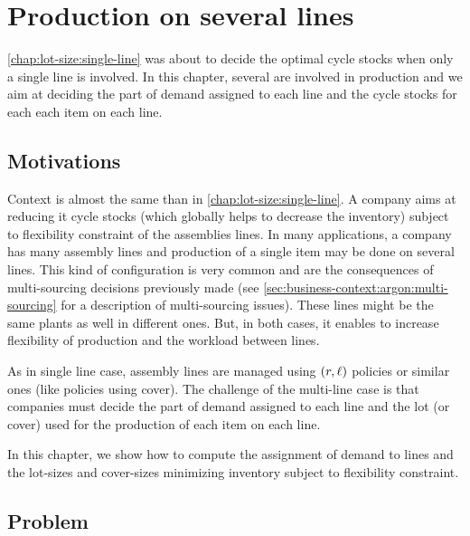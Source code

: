 \chapter{Production on several lines}
\label{chap:lot-size:several-lines}



\cref{chap:lot-size:single-line} was about to decide the optimal cycle stocks when only a single line is involved.
In this chapter, several are involved in production and we aim at deciding the part of demand assigned to each line and the cycle stocks for each each item on each line.



\section{Motivations}
\label{sec:lot-size:several-lines:motivations}


Context is almost the same than in \cref{chap:lot-size:single-line}.
A company aims at reducing it cycle stocks (which globally helps to decrease the inventory) subject to flexibility constraint of the assemblies lines.
In many applications, a company has many assembly lines and production of a single item may be done on several lines.
This kind of configuration is very common and are the consequences of multi-sourcing decisions previously made (see \cref{sec:business-context:argon:multi-sourcing} for a description of multi-sourcing issues).
These lines might be the same plants as well in different ones.
But, in both cases, it enables to increase flexibility of production and the workload between lines.


As in single line case, assembly lines are managed using $(r,\ell)$ policies or similar ones (like policies using cover).
The challenge of the multi-line case is that companies must decide the part of demand assigned to each line and the lot (or cover) used for the production of each item on each line.


In this chapter, we show how to compute the assignment of demand to lines and the lot-sizes and cover-sizes minimizing inventory subject to flexibility constraint.


\section{Problem}


